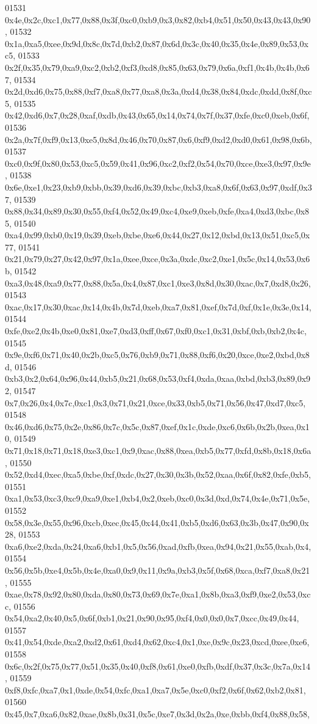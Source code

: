\begin{DoxyCode}
01531   0x4e,0x2c,0xc1,0x77,0x88,0x3f,0xc0,0xb9,0x3,0x82,0xb4,0x51,0x50,0x43,0x43,0x90,
01532   0x1a,0xa5,0xee,0x9d,0x8c,0x7d,0xb2,0x87,0x6d,0x3c,0x40,0x35,0x4e,0x89,0x53,0xc5,
01533   0x2f,0x35,0x79,0xa9,0xc2,0xb2,0xf3,0xd8,0x85,0x63,0x79,0x6a,0xf1,0x4b,0x4b,0x67,
01534   0x2d,0xd6,0x75,0x88,0xf7,0xa8,0x77,0xa8,0x3a,0xd4,0x38,0x84,0xdc,0xdd,0x8f,0xc5,
01535   0x42,0xd6,0x7,0x28,0xaf,0xdb,0x43,0x65,0x14,0x74,0x7f,0x37,0xfe,0xc0,0xeb,0x6f,
01536   0x2a,0x7f,0xf9,0x13,0xe5,0x8d,0x46,0x70,0x87,0x6,0xf9,0xd2,0xd0,0x61,0x98,0x6b,
01537   0xc0,0x9f,0x80,0x53,0xc5,0x59,0x41,0x96,0xc2,0xf2,0x54,0x70,0xce,0xe3,0x97,0x9e,
01538   0x6e,0xe1,0x23,0xb9,0xbb,0x39,0xd6,0x39,0xbc,0xb3,0xa8,0x6f,0x63,0x97,0xdf,0x37,
01539   0x88,0x34,0x89,0x30,0x55,0xf4,0x52,0x49,0xc4,0xe9,0xeb,0xfe,0xa4,0xd3,0xbc,0x85,
01540   0xa4,0x99,0xb0,0x19,0x39,0xeb,0xbe,0xe6,0x44,0x27,0x12,0xbd,0x13,0x51,0xc5,0x77,
01541   0x21,0x79,0x27,0x42,0x97,0x1a,0xee,0xce,0x3a,0xdc,0xc2,0xe1,0x5c,0x14,0x53,0x6b,
01542   0xa3,0x48,0xa9,0x77,0x88,0x5a,0x4,0x87,0xc1,0xe3,0x8d,0x30,0xac,0x7,0xd8,0x26,
01543   0xac,0x17,0x30,0xac,0x14,0x4b,0x7d,0xeb,0xa7,0x81,0xef,0x7d,0xf,0x1e,0x3e,0x14,
01544   0xfe,0xe2,0x4b,0xe0,0x81,0xe7,0xd3,0xff,0x67,0xf0,0xc1,0x31,0xbf,0xb,0xb2,0x4c,
01545   0x9e,0xf6,0x71,0x40,0x2b,0xc5,0x76,0xb9,0x71,0x88,0xf6,0x20,0xce,0xe2,0xbd,0x8d,
01546   0xb3,0x2,0x64,0x96,0x44,0xb5,0x21,0x68,0x53,0xf4,0xda,0xaa,0xbd,0xb3,0x89,0x92,
01547   0x7,0x26,0x4,0x7c,0xc1,0x3,0x71,0x21,0xce,0x33,0xb5,0x71,0x56,0x47,0xd7,0xc5,
01548   0x46,0xd6,0x75,0x2e,0x86,0x7c,0x5c,0x87,0xef,0x1c,0xde,0xc6,0x6b,0x2b,0xea,0x10,
01549   0x71,0x18,0x71,0x18,0xe3,0xc1,0x9,0xac,0x88,0xea,0xb5,0x77,0xfd,0x8b,0x18,0x6a,
01550   0x52,0xd4,0xec,0xa5,0xbe,0xf,0xdc,0x27,0x30,0x3b,0x52,0xaa,0x6f,0x82,0xfe,0xb5,
01551   0xa1,0x53,0xc3,0xc9,0xa9,0xe1,0xb4,0x2,0xeb,0xc0,0x3d,0xd,0x74,0x4e,0x71,0x5e,
01552   0x58,0x3e,0x55,0x96,0xcb,0xec,0x45,0x44,0x41,0xb5,0xd6,0x63,0x3b,0x47,0x90,0x28,
01553   0xa6,0xe2,0xda,0x24,0xa6,0xb1,0x5,0x56,0xad,0xfb,0xea,0x94,0x21,0x55,0xab,0x4,
01554   0x56,0x5b,0xe4,0x5b,0x4e,0xa0,0x9,0x11,0x9a,0xb3,0x5f,0x68,0xca,0xf7,0xa8,0x21,
01555   0xae,0x78,0x92,0x80,0xda,0x80,0x73,0x69,0x7e,0xa1,0x8b,0xa3,0xf9,0xe2,0x53,0xcc,
01556   0x54,0xa2,0x40,0x5,0x6f,0xb1,0x21,0x90,0x95,0xf4,0x0,0x0,0x7,0xcc,0x49,0x44,
01557   0x41,0x54,0xde,0xa2,0xd2,0x61,0xd4,0x62,0xc4,0x1,0xe,0x9c,0x23,0xcd,0xee,0xe6,
01558   0x6c,0x2f,0x75,0x77,0x51,0x35,0x40,0xf8,0x61,0xe0,0xfb,0xdf,0x37,0x3c,0x7a,0x14,
01559   0xf8,0xfc,0xa7,0x1,0xde,0x54,0xfc,0xa1,0xa7,0x5e,0xc0,0xf2,0x6f,0x62,0xb2,0x81,
01560   0x45,0x7,0xa6,0x82,0xae,0x8b,0x31,0x5c,0xe7,0x3d,0x2a,0xe,0xbb,0xf4,0x88,0x58,

\end{DoxyCode}
